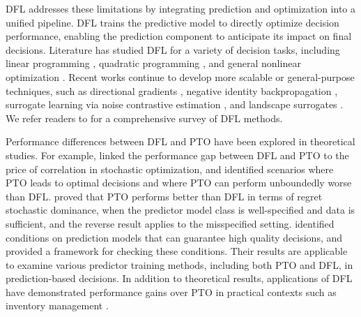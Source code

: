 \documentclass[ijoc,sglanonrev]{informs4}
\begin{document}
DFL addresses these limitations by integrating prediction and optimization into a unified pipeline. DFL trains the predictive model to directly optimize decision performance, enabling the prediction component to anticipate its impact on final decisions. Literature has studied DFL for a variety of decision tasks, including linear programming \citep{wilder2019melding, spo2020, berthet2020learning}, quadratic programming \citep{amos2017optnet, agrawal2019differentiable}, and general nonlinear optimization \citep{shah2022decision}. 
Recent works continue to develop more scalable or general-purpose techniques, such as directional gradients \citep{huang2024decision}, negative identity backpropagation \citep{sahoo2022backpropagation}, surrogate learning via noise contrastive estimation \citep{mulamba2020contrastive}, and landscape surrogates \citep{zharmagambetov2023landscape}. We refer readers to \cite{mandi2024decision} for a comprehensive survey of DFL methods. 

Performance differences between DFL and PTO have been explored in theoretical studies. For example, \cite{cameron2022perils} linked the performance gap between DFL and PTO to the price of correlation in stochastic optimization, and identified scenarios where PTO leads to optimal decisions and where PTO can perform unboundedly worse than DFL. 
\cite{elmachtoub2023estimate} proved that PTO performs better than DFL in terms of regret stochastic dominance, when the predictor model class is well-specified and data is sufficient, and the reverse result applies to the misspecified setting. 
\cite{ho2022risk} identified conditions on prediction models that can guarantee high quality decisions, and provided a framework for checking these conditions. Their results are applicable to examine various predictor training methods, including both PTO and DFL, in prediction-based decisions. 
In addition to theoretical results, applications of DFL have demonstrated performance gains over PTO in practical contexts such as inventory management \citep{chung2022decision, qi2023practical}.
\end{document}
